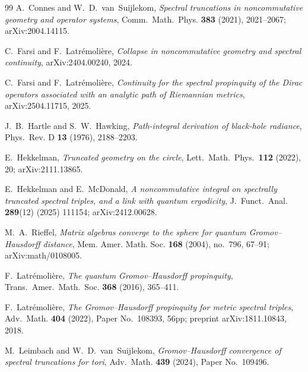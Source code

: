 \documentclass[11pt,a4paper]{article}
\theoremstyle{plain}
\theoremstyle{definition}
\begin{document}
\begin{thebibliography}{99}
A.~Connes and W.~D.~van~Suijlekom,
\newblock \emph{Spectral truncations in noncommutative geometry and
operator systems},
\newblock Comm.~Math.~Phys. \textbf{383} (2021), 2021--2067;
\newblock arXiv:2004.14115.

C.~Farsi and F.~Latr\'emoli\`ere,
\newblock \emph{Collapse in noncommutative geometry and spectral
continuity},
\newblock arXiv:2404.00240, 2024.

C.~Farsi and F.~Latr\'emoli\`ere,
\newblock \emph{Continuity for the spectral propinquity of the
Dirac operators associated with an analytic path of Riemannian
metrics},
\newblock arXiv:2504.11715, 2025.

J.~B.~Hartle and S.~W.~Hawking,
\newblock \emph{Path-integral derivation of black-hole radiance},
\newblock Phys.~Rev. D \textbf{13} (1976), 2188--2203.

E.~Hekkelman,
\newblock \emph{Truncated geometry on the circle},
\newblock Lett.~Math.~Phys.\ \textbf{112} (2022), 20;
\newblock arXiv:2111.13865.

E.~Hekkelman and E.~McDonald,
\newblock \emph{A noncommutative integral on spectrally truncated
spectral triples, and a link with quantum ergodicity},
\newblock J.~Funct.~Anal. \textbf{289}(12) (2025) 111154;
\newblock arXiv:2412.00628.

M.~A.~Rieffel,
\newblock \emph{Matrix algebras converge to the sphere for quantum
Gromov--Hausdorff distance},
\newblock Mem. Amer. Math. Soc. \textbf{168} (2004), no.~796, 67--91;
arXiv:math/0108005.

F.~Latr\'emoli\`ere,
\newblock \emph{The quantum Gromov--Hausdorff propinquity},
\newblock Trans.~Amer.~Math.~Soc. \textbf{368} (2016), 365--411.

F.~Latr\'emoli\`ere,
\newblock \emph{The Gromov--Hausdorff propinquity for metric spectral
triples},
\newblock Adv.~Math. \textbf{404} (2022), Paper No.~108393, 56pp;
\newblock preprint arXiv:1811.10843, 2018.

M.~Leimbach and W.~D.~van~Suijlekom,
\newblock \emph{Gromov--Hausdorff convergence of spectral truncations
for tori},
\newblock Adv.~Math. \textbf{439} (2024), Paper No.~109496.


\end{thebibliography}
\end{document}
